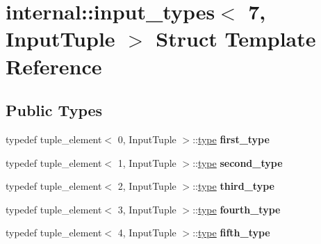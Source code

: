 \hypertarget{structinternal_1_1input__types_3_017_00_01InputTuple_01_4}{}\section{internal\+:\+:input\+\_\+types$<$ 7, Input\+Tuple $>$ Struct Template Reference}
\label{structinternal_1_1input__types_3_017_00_01InputTuple_01_4}
\subsection*{Public Types}
\begin{DoxyCompactItemize}
\item 
\hypertarget{structinternal_1_1input__types_3_017_00_01InputTuple_01_4_a658800a568e3f69adf674b5af2dd9822}{}typedef tuple\+\_\+element$<$ 0, Input\+Tuple $>$\+::\hyperlink{classinternal_1_1tagged__msg}{type} {\bfseries first\+\_\+type}\label{structinternal_1_1input__types_3_017_00_01InputTuple_01_4_a658800a568e3f69adf674b5af2dd9822}

\item 
\hypertarget{structinternal_1_1input__types_3_017_00_01InputTuple_01_4_af1eec3db73714074ea2116f44290da84}{}typedef tuple\+\_\+element$<$ 1, Input\+Tuple $>$\+::\hyperlink{classinternal_1_1tagged__msg}{type} {\bfseries second\+\_\+type}\label{structinternal_1_1input__types_3_017_00_01InputTuple_01_4_af1eec3db73714074ea2116f44290da84}

\item 
\hypertarget{structinternal_1_1input__types_3_017_00_01InputTuple_01_4_a02b55b9c4e4f23831a34c1a67e07ae2b}{}typedef tuple\+\_\+element$<$ 2, Input\+Tuple $>$\+::\hyperlink{classinternal_1_1tagged__msg}{type} {\bfseries third\+\_\+type}\label{structinternal_1_1input__types_3_017_00_01InputTuple_01_4_a02b55b9c4e4f23831a34c1a67e07ae2b}

\item 
\hypertarget{structinternal_1_1input__types_3_017_00_01InputTuple_01_4_a4e70b7c2f0092e9a4fcab39d93969351}{}typedef tuple\+\_\+element$<$ 3, Input\+Tuple $>$\+::\hyperlink{classinternal_1_1tagged__msg}{type} {\bfseries fourth\+\_\+type}\label{structinternal_1_1input__types_3_017_00_01InputTuple_01_4_a4e70b7c2f0092e9a4fcab39d93969351}

\item 
\hypertarget{structinternal_1_1input__types_3_017_00_01InputTuple_01_4_af208feeaa5df669595b6d21ca87246ce}{}typedef tuple\+\_\+element$<$ 4, Input\+Tuple $>$\+::\hyperlink{classinternal_1_1tagged__msg}{type} {\bfseries fifth\+\_\+type}\label{structinternal_1_1input__types_3_017_00_01InputTuple_01_4_af208feeaa5df669595b6d21ca87246ce}


\end{DoxyCompactItemize}
